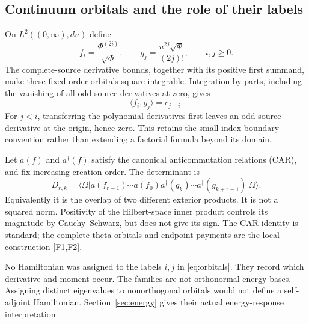 \documentclass[11pt,letterpaper]{article}
\numberwithin{equation}{section}
\theoremstyle{remark}
\newcommand{\ket}[1]{\lvert #1\rangle}
\newcommand{\bra}[1]{\langle #1\rvert}
\newcommand{\ip}[2]{\langle #1,#2\rangle}
\newcommand{\ev}[1]{\textsf{[#1]}}
\begin{document}
\subsection{Continuum orbitals and the role of their labels}
On $L^2((0,\infty),du)$ define
\begin{equation}
 f_i=\frac{\Phi^{(2i)}}{\sqrt\Phi},\qquad
 g_j=\frac{u^{2j}\sqrt\Phi}{(2j)!},\qquad i,j\ge0.
 \label{eq:orbitals}
\end{equation}
The complete-source derivative bounds, together with its positive first
summand, make these fixed-order orbitals square integrable. Integration by parts, including the vanishing of
all odd source derivatives at zero, gives
\begin{equation}
 \ip{f_i}{g_j}=c_{j-i}. \label{eq:overlap}
\end{equation}
For $j<i$, transferring the polynomial derivatives first leaves an odd
source derivative at the origin, hence zero. This retains the small-index
boundary convention rather than extending a factorial formula beyond
its domain.

Let $a(f)$ and $a^\dagger(f)$ satisfy the canonical anticommutation
relations (CAR), and fix increasing creation order. The determinant is
\begin{equation}
 D_{r,k}=\bra{\Omega}a(f_{r-1})\cdots a(f_0)
 a^\dagger(g_k)\cdots a^\dagger(g_{k+r-1})\ket{\Omega}.
 \label{eq:car}
\end{equation}
Equivalently it is the overlap of two different exterior products.
It is not a squared norm. Positivity of the Hilbert-space inner product
controls its magnitude by Cauchy--Schwarz, but does not give its sign.
The CAR identity is standard; the complete theta orbitals and endpoint
payments are the local construction \ev{F1,F2}.

No Hamiltonian was assigned to the labels $i,j$ in
\eqref{eq:orbitals}. They record which derivative and moment occur.
The families are not orthonormal energy bases. Assigning distinct
eigenvalues to nonorthogonal orbitals would not define a self-adjoint
Hamiltonian. Section~\ref{sec:energy} gives their actual energy-response
interpretation.
\end{document}
